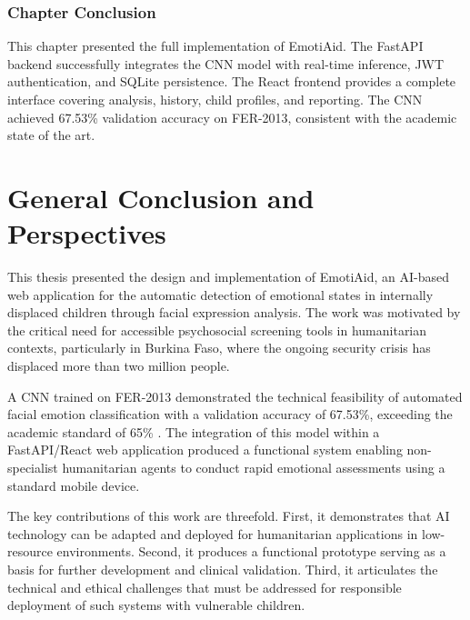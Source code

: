 \documentclass[a4paper,12pt,oneside]{report}
\begin{document}
\subsection*{Chapter Conclusion}

This chapter presented the full implementation of EmotiAid. The FastAPI backend
successfully integrates the CNN model with real-time inference, JWT authentication,
and SQLite persistence. The React frontend provides a complete interface covering
analysis, history, child profiles, and reporting. The CNN achieved 67.53\%
validation accuracy on FER-2013, consistent with the academic state of the art.

\clearpage

\chapter*{General Conclusion and Perspectives}
\justifying

This thesis presented the design and implementation of EmotiAid, an AI-based web
application for the automatic detection of emotional states in internally displaced
children through facial expression analysis. The work was motivated by the critical
need for accessible psychosocial screening tools in humanitarian contexts,
particularly in Burkina Faso, where the ongoing security crisis has displaced more
than two million people.

A CNN trained on FER-2013 demonstrated the technical feasibility of automated
facial emotion classification with a validation accuracy of 67.53\%, exceeding the
academic standard of 65\% \cite{goodfellow2013}. The integration of this model
within a FastAPI/React web application produced a functional system enabling
non-specialist humanitarian agents to conduct rapid emotional assessments using a
standard mobile device.

The key contributions of this work are threefold. First, it demonstrates that AI
technology can be adapted and deployed for humanitarian applications in low-resource
environments. Second, it produces a functional prototype serving as a basis for
further development and clinical validation. Third, it articulates the technical
and ethical challenges that must be addressed for responsible deployment of such
systems with vulnerable children.
\end{document}
